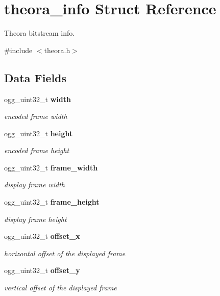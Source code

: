 \section{theora\_\-info Struct Reference}
\label{structtheora__info}


Theora bitstream info.  




{\ttfamily \#include $<$theora.h$>$}

\subsection*{Data Fields}
\begin{DoxyCompactItemize}
\item 
ogg\_\-uint32\_\-t {\bf width}
\begin{DoxyCompactList}\small\item\em encoded frame width \item\end{DoxyCompactList}\item 
ogg\_\-uint32\_\-t {\bf height}
\begin{DoxyCompactList}\small\item\em encoded frame height \item\end{DoxyCompactList}\item 
ogg\_\-uint32\_\-t {\bf frame\_\-width}
\begin{DoxyCompactList}\small\item\em display frame width \item\end{DoxyCompactList}\item 
ogg\_\-uint32\_\-t {\bf frame\_\-height}
\begin{DoxyCompactList}\small\item\em display frame height \item\end{DoxyCompactList}\item 
ogg\_\-uint32\_\-t {\bf offset\_\-x}
\begin{DoxyCompactList}\small\item\em horizontal offset of the displayed frame \item\end{DoxyCompactList}\item 
ogg\_\-uint32\_\-t {\bf offset\_\-y}
\begin{DoxyCompactList}\small\item\em vertical offset of the displayed frame \item\end{DoxyCompactList}\item 

\end{DoxyCompactItemize}
